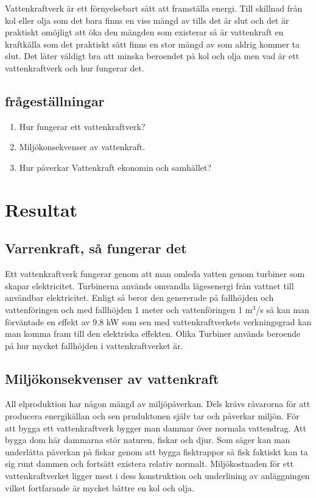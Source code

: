 \documentclass[11p]{article}
\begin{document}
Vattenkraftverk är ett förnyelsebart sätt att framställa energi.
 Till skillnad från kol eller olja som det bara finns en viss mängd av tills det är slut och det är praktiskt omöjligt att öka den mängden som existerar så är vattenkraft en kraftkälla som det praktiskt sätt finns en stor mängd av som aldrig kommer ta slut.
Det låter väldigt bra att minska beroendet på kol och olja men vad är ett vattenkraftverk och hur fungerar det.

 \subsection{frågeställningar}
 \begin{enumerate}
  \item Hur fungerar ett vattenkraftverk?
  \item Miljökonsekvenser av vattenkraft.
  \item Hur påverkar Vattenkraft ekonomin och samhället?
 \end{enumerate}

 \section{Resultat}

 \subsection{Varrenkraft, så fungerar det}

 Ett vattenkraftverk fungerar genom att man omleda vatten genom turbiner som skapar elektricitet.
 Turbinerna används omvandla lägesenergi från vattnet till användbar elektricitet.
 Enligt \textcite{NE} så beror den genererade på fallhöjden och vattenföringen och med fallhöjden 1 meter och vattenföringen 1 m${^3}$/s så kan man förväntade en effekt av 9.8 kW som sen med vattenkraftverkets verkningsgrad kan man komma fram till den elektriska effekten.
Olika Turbiner används beroende på hur mycket fallhöjden i vattenkraftverket är.

 \subsection{Miljökonsekvenser av vattenkraft}

 All elproduktion har någon mängd av miljöpåverkan. Dels krävs råvarorna för att producera energikällan och sen pruduktonen själv tar och påverkar miljön.
 För att bygga ett vattenkraftverk bygger man dammar över normala vattendrag.
 Att bygga dom här dammarna stör naturen, fiskar och djur.
 Som \textcite{vattenfall} säger kan man underlätta påverkan på fiskar genom att bygga fisktrappor så fisk faktiskt kan ta sig runt dammen och fortsätt existera relativ normalt.
 Miljökostnaden för ett vattenkraftverket ligger mest i dess konstruktion och underlining av anläggningen vilket fortfarande är mycket bättre en kol och olja.
\end{document}
